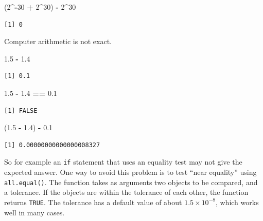 \documentclass[
]{krantz}
\makeatletter
\newenvironment{Shaded}{\begin{snugshade}}{\end{snugshade}}
\newcommand{\DecValTok}[1]{\textcolor[rgb]{0.06,0.06,0.06}{#1}}
\newcommand{\FloatTok}[1]{\textcolor[rgb]{0.06,0.06,0.06}{#1}}
\newcommand{\NormalTok}[1]{#1}
\newcommand{\OperatorTok}[1]{\textcolor[rgb]{0.43,0.43,0.43}{\textbf{#1}}}
\newcommand{\StringTok}[1]{\textcolor[rgb]{0.5,0.5,0.5}{#1}}
\newenvironment{kframe}{%
\medskip{}
\setlength{\fboxsep}{.8em}
 \def\at@end@of@kframe{}%
 \ifinner\ifhmode%
  \def\at@end@of@kframe{\end{minipage}}%
  \begin{minipage}{\columnwidth}%
 \fi\fi%
 \def\FrameCommand##1{\hskip\@totalleftmargin \hskip-\fboxsep
 \colorbox{shadecolor}{##1}\hskip-\fboxsep
     \hskip-\linewidth \hskip-\@totalleftmargin \hskip\columnwidth}%
 \MakeFramed {\advance\hsize-\width
   \@totalleftmargin\z@ \linewidth\hsize
   \@setminipage}}%
 {\par\unskip\endMakeFramed%
 \at@end@of@kframe}
\renewenvironment{Shaded}{\begin{kframe}}{\end{kframe}}
\makeatother
\begin{document}
\begin{Shaded}
\begin{Highlighting}[]
\NormalTok{(}\DecValTok{2}\OperatorTok{\^{}{-}}\DecValTok{30} \OperatorTok{+}\StringTok{ }\DecValTok{2}\OperatorTok{\^{}}\DecValTok{30}\NormalTok{) }\OperatorTok{{-}}\StringTok{ }\DecValTok{2}\OperatorTok{\^{}}\DecValTok{30}
\end{Highlighting}
\end{Shaded}

\begin{verbatim}
[1] 0
\end{verbatim}

Computer arithmetic is not exact.

\begin{Shaded}
\begin{Highlighting}[]
\FloatTok{1.5} \OperatorTok{{-}}\StringTok{ }\FloatTok{1.4}
\end{Highlighting}
\end{Shaded}

\begin{verbatim}
[1] 0.1
\end{verbatim}

\begin{Shaded}
\begin{Highlighting}[]
\FloatTok{1.5} \OperatorTok{{-}}\StringTok{ }\FloatTok{1.4} \OperatorTok{==}\StringTok{ }\FloatTok{0.1}
\end{Highlighting}
\end{Shaded}

\begin{verbatim}
[1] FALSE
\end{verbatim}

\begin{Shaded}
\begin{Highlighting}[]
\NormalTok{(}\FloatTok{1.5} \OperatorTok{{-}}\StringTok{ }\FloatTok{1.4}\NormalTok{) }\OperatorTok{{-}}\StringTok{ }\FloatTok{0.1}
\end{Highlighting}
\end{Shaded}

\begin{verbatim}
[1] 0.00000000000000008327
\end{verbatim}

So for example an \texttt{if} statement that uses an equality test may not give the expected answer. One way to avoid this problem is to test ``near equality'' using \texttt{all.equal()}. The function takes as arguments two objects to be compared, and a tolerance. If the objects are within the tolerance of each other, the function returns \texttt{TRUE}. The tolerance has a default value of about \(1.5\times 10^{-8}\), which works well in many cases.
\end{document}
